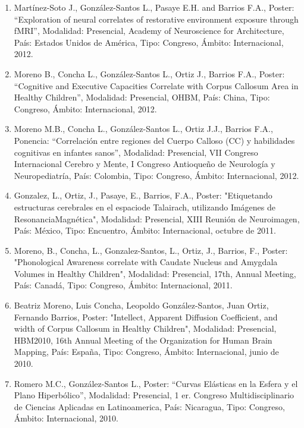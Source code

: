 \begin{enumerate}
\item Martínez-Soto J., González-Santos L., Pasaye E.H. and Barrios F.A., Poster: “Exploration of neural correlates of 
restorative environment exposure through fMRI”, Modalidad: Presencial, Academy of Neuroscience for Architecture, País: 
Estados Unidos de América, Tipo: Congreso, Ámbito: Internacional, 2012.

\item Moreno B., Concha L., González-Santos L., Ortiz J., Barrios F.A., Poster: “Cognitive and Executive Capacities Correlate 
with Corpus Callosum Area in Healthy Children”, Modalidad: Presencial, OHBM, País: China, Tipo: Congreso, Ámbito: 
Internacional, 2012.

\item Moreno M.B., Concha L., González-Santos L., Ortiz J.J., Barrios F.A., Ponencia: “Correlación entre regiones del Cuerpo 
Calloso (CC) y habilidades cognitivas en infantes sanos”, Modalidad: Presencial, VII Congreso Internacional Cerebro y 
Mente, I Congreso Antioqueño de Neurología y Neuropediatría, País: Colombia, Tipo: Congreso, Ámbito: Internacional, 2012.

\item Gonzalez, L., Ortiz, J., Pasaye, E., Barrios, F.A., Poster: "Etiquetando estructuras cerebrales en el espaciode 
Talairach, utilizando Imágenes de ResonanciaMagnética", Modalidad: Presencial, XIII Reunión de Neuroimagen, País: México, 
Tipo: Encuentro, Ámbito: Internacional, octubre de 2011.

\item Moreno, B., Concha, L., Gonzalez-Santos, L., Ortiz, J., Barrios, F., Poster: "Phonological Awareness correlate with 
Caudate Nucleus and Amygdala Volumes in Healthy Children", Modalidad: Presencial, 17th, Annual Meeting, País: Canadá, Tipo: 
Congreso, Ámbito: Internacional, 2011.

\item Beatriz Moreno, Luis Concha, Leopoldo González-Santos, Juan Ortiz, Fernando Barrios, Poster: "Intellect, Apparent 
Diffusion Coefficient, and width of Corpus Callosum in Healthy Children", Modalidad: Presencial, HBM2010, 16th Annual 
Meeting of the Organization for Human Brain Mapping, País: España, Tipo: Congreso, Ámbito: Internacional, junio de 2010.

\item Romero M.C., González-Santos L., Poster: “Curvas Elásticas en la Esfera y el Plano Hiperbólico”, Modalidad: Presencial, 
1 er. Congreso Multidisciplinario de Ciencias Aplicadas en Latinoamerica, País: Nicaragua, Tipo: Congreso, Ámbito: 
Internacional, 2010.


\end{enumerate}
